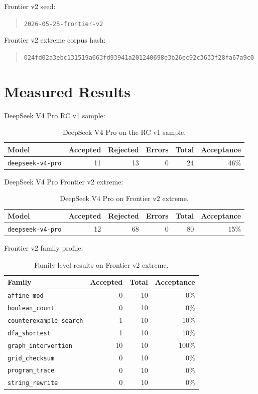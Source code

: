 \documentclass[11pt]{article}
\begin{document}
Frontier v2 seed:
\begin{quote}
\texttt{2026-05-25-frontier-v2}
\end{quote}

Frontier v2 extreme corpus hash:
\begin{quote}
\texttt{024fd02a3ebc131519a663fd93941a201240698e3b26ec92c3633f28fa67a9c0}
\end{quote}

\section{Measured Results}

DeepSeek V4 Pro RC v1 sample:

\begin{table}[h]
\centering
\begin{tabular}{lrrrrr}
\toprule
Model & Accepted & Rejected & Errors & Total & Acceptance \\
\midrule
\texttt{deepseek-v4-pro} & 11 & 13 & 0 & 24 & 46\% \\
\bottomrule
\end{tabular}
\caption{DeepSeek V4 Pro on the RC v1 sample.}
\end{table}

DeepSeek V4 Pro Frontier v2 extreme:

\begin{table}[h]
\centering
\begin{tabular}{lrrrrr}
\toprule
Model & Accepted & Rejected & Errors & Total & Acceptance \\
\midrule
\texttt{deepseek-v4-pro} & 12 & 68 & 0 & 80 & 15\% \\
\bottomrule
\end{tabular}
\caption{DeepSeek V4 Pro on Frontier v2 extreme.}
\end{table}

Frontier v2 family profile:

\begin{table}[h]
\centering
\begin{tabular}{lrrr}
\toprule
Family & Accepted & Total & Acceptance \\
\midrule
\texttt{affine\_mod} & 0 & 10 & 0\% \\
\texttt{boolean\_count} & 0 & 10 & 0\% \\
\texttt{counterexample\_search} & 1 & 10 & 10\% \\
\texttt{dfa\_shortest} & 1 & 10 & 10\% \\
\texttt{graph\_intervention} & 10 & 10 & 100\% \\
\texttt{grid\_checksum} & 0 & 10 & 0\% \\
\texttt{program\_trace} & 0 & 10 & 0\% \\
\texttt{string\_rewrite} & 0 & 10 & 0\% \\
\bottomrule
\end{tabular}
\caption{Family-level results on Frontier v2 extreme.}
\end{table}
\end{document}
